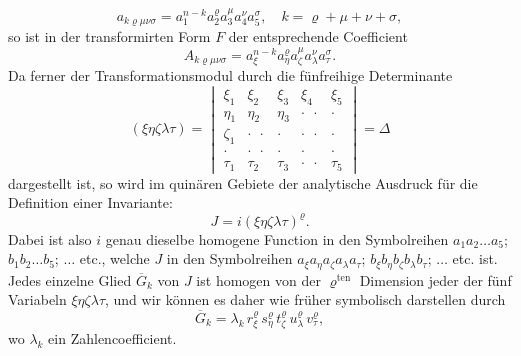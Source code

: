 \documentclass[11pt]{article}
\providecommand{\weberpage}[1]{}
\providecommand{\weq}[2]{\begin{equation}\tag{#1}#2\end{equation}}
\let\Delta\varDelta
\begin{document}
\weberpage{115}
\[
a_{k\varrho\mu\nu\sigma} = a_1^{n-k} a_2^\varrho a_3^\mu a_4^\nu a_5^\sigma, \quad k = \varrho + \mu + \nu + \sigma,
\]
so ist in der transformirten Form $F$ der entsprechende Coefficient
\[
A_{k\varrho\mu\nu\sigma} = a_\xi^{n-k} a_\eta^\varrho a_\zeta^\mu a_\lambda^\nu a_\tau^\sigma.
\]
Da ferner der Transformationsmodul durch die fünfreihige Determinante
\[
(\xi\eta\zeta\lambda\tau) =
\begin{vmatrix}
\xi_1 & \xi_2 & \xi_3 & \xi_4 & \xi_5\\
\eta_1 & \eta_2 & \eta_3 & \cdot\ \ \cdot & \cdot\\
\zeta_1 & \cdot\ \ \cdot & \cdot & \cdot\ \ \cdot & \cdot\\
\cdot & \cdot\ \ \cdot & \cdot & \cdot & \cdot\\
\tau_1 & \tau_2 & \tau_3 & \cdot\ \ \cdot & \tau_5
\end{vmatrix}
= \Delta %
\]
dargestellt ist, so wird im quinären Gebiete der analytische Ausdruck für die Definition einer Invariante:
\weq{I}{J = i (\xi\eta\zeta\lambda\tau)^\varrho.}
Dabei ist also $i$ genau dieselbe homogene Function in den Symbolreihen $a_1 a_2 \ldots a_5$; $b_1 b_2 \ldots b_5$; $\ldots$ etc., welche $J$ in den Symbolreihen $a_\xi a_\eta a_\zeta a_\lambda a_\tau$; $b_\xi b_\eta b_\zeta b_\lambda b_\tau$; $\ldots$ etc. ist. Jedes einzelne Glied $\overline{G}_k$ von $J$ ist homogen von der $\varrho^{\text{ten}}$ Dimension jeder der fünf Variabeln $\xi\eta\zeta\lambda\tau$, und wir können es daher wie früher symbolisch darstellen durch
\[
\overline{G}_k = \lambda_k\, r_\xi^\varrho\, s_\eta^\varrho\, t_\zeta^\varrho\, u_\lambda^\varrho\, v_\tau^\varrho,
\]
wo $\lambda_k$ ein Zahlencoefficient.
\end{document}
